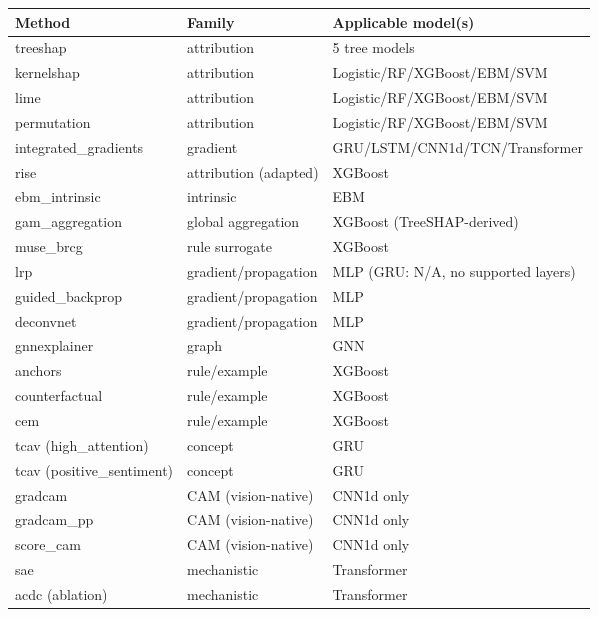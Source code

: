 \begin{tabular}{@{}lll@{}}
\toprule
Method & Family & Applicable model(s) \\
\midrule
treeshap & attribution & 5 tree models \\
kernelshap & attribution & Logistic/RF/XGBoost/EBM/SVM \\
lime & attribution & Logistic/RF/XGBoost/EBM/SVM \\
permutation & attribution & Logistic/RF/XGBoost/EBM/SVM \\
integrated\_gradients & gradient & GRU/LSTM/CNN1d/TCN/Transformer \\
rise & attribution (adapted) & XGBoost \\
ebm\_intrinsic & intrinsic & EBM \\
gam\_aggregation & global aggregation & XGBoost (TreeSHAP-derived) \\
muse\_brcg & rule surrogate & XGBoost \\
lrp & gradient/propagation & MLP (GRU: N/A, no supported layers) \\
guided\_backprop & gradient/propagation & MLP \\
deconvnet & gradient/propagation & MLP \\
gnnexplainer & graph & GNN \\
anchors & rule/example & XGBoost \\
counterfactual & rule/example & XGBoost \\
cem & rule/example & XGBoost \\
tcav (high\_attention) & concept & GRU \\
tcav (positive\_sentiment) & concept & GRU \\
gradcam & CAM (vision-native) & CNN1d only \\
gradcam\_pp & CAM (vision-native) & CNN1d only \\
score\_cam & CAM (vision-native) & CNN1d only \\
sae & mechanistic & Transformer \\
acdc (ablation) & mechanistic & Transformer \\
\bottomrule
\end{tabular}
